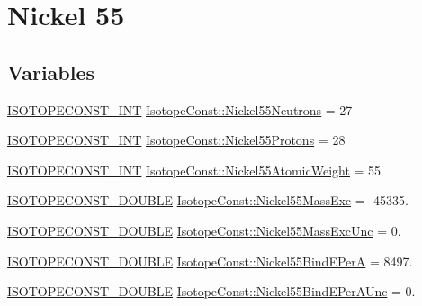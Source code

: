 \hypertarget{group___isotope_const-_nickel-_ni55}{}\section{Nickel 55}
\label{group___isotope_const-_nickel-_ni55}
\subsection*{Variables}
\begin{DoxyCompactItemize}
\item 
\mbox{\hyperlink{group___isotope_const-_macros_ga5f18360b3e99483a35c32d789e62621c}{I\+S\+O\+T\+O\+P\+E\+C\+O\+N\+S\+T\+\_\+\+I\+NT}} \mbox{\hyperlink{group___isotope_const-_nickel-_ni55_gaf6ba38f241a0267c8110e3ab36e75a17}{Isotope\+Const\+::\+Nickel55\+Neutrons}} = 27
\item 
\mbox{\hyperlink{group___isotope_const-_macros_ga5f18360b3e99483a35c32d789e62621c}{I\+S\+O\+T\+O\+P\+E\+C\+O\+N\+S\+T\+\_\+\+I\+NT}} \mbox{\hyperlink{group___isotope_const-_nickel-_ni55_ga4178717c88a60446cca3badc2491c60a}{Isotope\+Const\+::\+Nickel55\+Protons}} = 28
\item 
\mbox{\hyperlink{group___isotope_const-_macros_ga5f18360b3e99483a35c32d789e62621c}{I\+S\+O\+T\+O\+P\+E\+C\+O\+N\+S\+T\+\_\+\+I\+NT}} \mbox{\hyperlink{group___isotope_const-_nickel-_ni55_ga167ab029dcebf7ed9bd945f31c8d63fe}{Isotope\+Const\+::\+Nickel55\+Atomic\+Weight}} = 55
\item 
\mbox{\hyperlink{group___isotope_const-_macros_ga8f45a7272ce02c0b4c65c44636ed719a}{I\+S\+O\+T\+O\+P\+E\+C\+O\+N\+S\+T\+\_\+\+D\+O\+U\+B\+LE}} \mbox{\hyperlink{group___isotope_const-_nickel-_ni55_ga74cfd452df4175645e4625f04dd3f398}{Isotope\+Const\+::\+Nickel55\+Mass\+Exc}} = -\/45335.
\item 
\mbox{\hyperlink{group___isotope_const-_macros_ga8f45a7272ce02c0b4c65c44636ed719a}{I\+S\+O\+T\+O\+P\+E\+C\+O\+N\+S\+T\+\_\+\+D\+O\+U\+B\+LE}} \mbox{\hyperlink{group___isotope_const-_nickel-_ni55_ga69b4b7ba6547ac63d702af05816e6ae7}{Isotope\+Const\+::\+Nickel55\+Mass\+Exc\+Unc}} = 0.
\item 
\mbox{\hyperlink{group___isotope_const-_macros_ga8f45a7272ce02c0b4c65c44636ed719a}{I\+S\+O\+T\+O\+P\+E\+C\+O\+N\+S\+T\+\_\+\+D\+O\+U\+B\+LE}} \mbox{\hyperlink{group___isotope_const-_nickel-_ni55_ga297bb0456c5d37ccb647472498a3fe6e}{Isotope\+Const\+::\+Nickel55\+Bind\+E\+PerA}} = 8497.
\item 
\mbox{\hyperlink{group___isotope_const-_macros_ga8f45a7272ce02c0b4c65c44636ed719a}{I\+S\+O\+T\+O\+P\+E\+C\+O\+N\+S\+T\+\_\+\+D\+O\+U\+B\+LE}} \mbox{\hyperlink{group___isotope_const-_nickel-_ni55_ga8ef89a48d8b1e1b78a0f7d5989130a3c}{Isotope\+Const\+::\+Nickel55\+Bind\+E\+Per\+A\+Unc}} = 0.

\end{DoxyCompactItemize}
